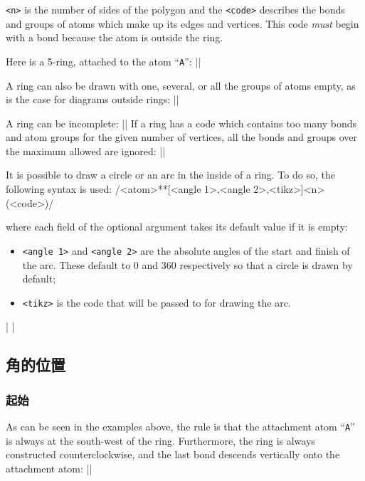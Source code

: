 \documentclass[10pt]{article}
\begin{document}
\verb/<n>/ is the number of sides of the polygon and the \verb/<code>/ describes the bonds and groups of atoms which make up its edges and vertices. This code \emph{must} begin with a bond because the atom is outside the ring.

Here is a 5-ring, attached to the atom ``\verb/A/'':
||

A ring can also be drawn with one, several, or all the groups of atoms empty, as is the case for diagrams outside rings:
||

A ring can be incomplete:
||
If a ring has a code which contains too many bonds and atom groups for the given number of vertices, all the bonds and groups over the maximum allowed are ignored:
||

It is possible to draw a circle or an arc in the inside of a ring. To do so, the following syntax is used:
\centerverb/<atom>**[<angle 1>,<angle 2>,<tikz>]<n>(<code>)/
\smallskip

where each field of the optional argument takes its default value if it is empty:
\begin{itemize}
	\item \verb/<angle 1>/ and \verb/<angle 2>/ are the absolute angles of the start and finish of the arc. These default to 0\degres{} and 360\degres{} respectively so that a circle is drawn by default;
	\item \verb/<tikz>/ is the code that will be passed to \TIKZ for drawing the arc.
\end{itemize}

|\quad
	\quad
	|

\subsection{角的位置}
\subsubsection{起始}
As can be seen in the examples above, the rule is that the attachment atom ``\verb/A/'' is always at the south-west of the ring. Furthermore, the ring is always constructed counterclockwise, and the last bond descends vertically onto the attachment atom:
|\qquad{}|
\end{document}
